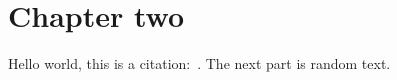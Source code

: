 \chapter{Chapter two}
\label{chap:c2}

Hello world, this is a citation:~\cite{Guyton:1956:TextbookPhysiology}.
The next part is random text.

\lipsum


\printbibliography[heading=subbibliography]

